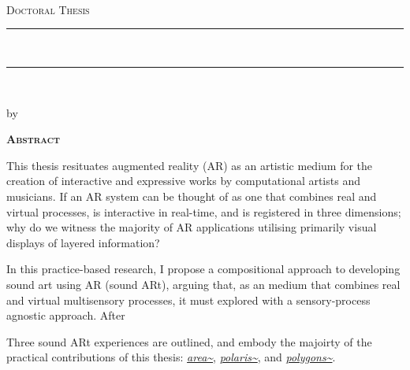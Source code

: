 
\thispagestyle{empty}

\begin{center}

    {\normalsize \href{http://www.sussex.ac.uk/}{\myUni} \\} %
    {\normalsize \myFaculty \\} %
    {\normalsize \myDepartment \\} %
    \bigskip\vspace*{.02\textheight}
    {\Large \textsc{Doctoral Thesis}}\par
    \bigskip
    
    {\rule{\linewidth}{1pt}\\%
    \Large \myTitle \par} %
    \rule{\linewidth}{1pt}\\[0.4cm]
    
    \bigskip
	{\normalsize by \myName \par} %
    \bigskip\vspace*{.06\textheight}
\end{center}

    {\centering\Huge\textsc{\textbf{Abstract}} \par}
    \bigskip



    \noindent This thesis resituates augmented reality (AR) as an artistic medium for the creation of interactive and expressive works by computational artists and musicians. If an AR system can be thought of as one that combines real and virtual processes, is interactive in real-time, and is registered in three dimensions; why do we witness the majority of AR applications utilising primarily visual displays of layered information? 
    
    In this practice-based research, I propose a compositional approach to developing sound art using AR (sound ARt), arguing that, as an medium that combines real and virtual multisensory processes, it must explored with a sensory-process agnostic approach. After
    
    Three sound ARt experiences are outlined, and embody the majoirty of the practical contributions of this thesis: \textit{\hyperref[sec: area]{area\textasciitilde{}}}, \textit{\hyperref[sec: polaris]{polaris\textasciitilde{}}}, and \textit{\hyperref[sec: polygons]{polygons\textasciitilde{}}}. 
    
